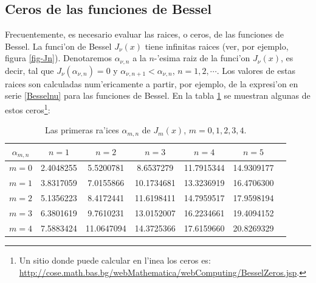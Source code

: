 \subsection{Ceros de las funciones de Bessel}
Frecuentemente, es necesario evaluar las raices, o ceros, de las funciones de Bessel. La funci'on de Bessel $J_\nu(x)$ tiene infinitas raices (ver, por ejemplo, figura \ref{fig-Jn}). Denotaremos $\alpha_{\nu,n}$ a la $n$-'esima raiz de la funci'on $J_\nu(x)$, es decir, tal que $J_\nu(\alpha_{\nu,n})=0$ y $\alpha_{\nu,n+1}<\alpha_{\nu,n}$, $n=1,2,\cdots$. Los valores de estas raices son calculadas num'ericamente a partir, por ejemplo, de la expresi'on en serie \eqref{Besselnu} para las funciones de Bessel. En la tabla \ref{tabla:alphanun} se muestran algunas de estos ceros\footnote{Un sitio donde puede calcular en l'inea los ceros es: \url{http://cose.math.bas.bg/webMathematica/webComputing/BesselZeros.jsp}.}:
\begin{table}
\begin{center}
\begin{tabular}{ccccccc}
\hline $\alpha_{m,n}$ & $n=1$ & $n=2$ & $n=3$ & $n=4$ & $n=5$ \\ \hline 
$m=0$ & 2.4048255 &  5.5200781 &  8.6537279 & 11.7915344 & 14.9309177\\
$m=1$ & 3.8317059 &  7.0155866 & 10.1734681 & 13.3236919 & 16.4706300\\
$m=2$ & 5.1356223 &  8.4172441 & 11.6198411 & 14.7959517 & 17.9598194 \\
$m=3$ & 6.3801619 &  9.7610231 & 13.0152007 & 16.2234661 & 19.4094152 \\
$m=4$ & 7.5883424 & 11.0647094 & 14.3725366 & 17.6159660 & 20.8269329 \\
\hline 
\end{tabular} 
\caption{Las primeras ra'ices $\alpha_{m,n}$ de $J_m(x)$, $m=0,1,2,3,4$.}
\label{tabla:alphanun}
\end{center}
\end{table}

